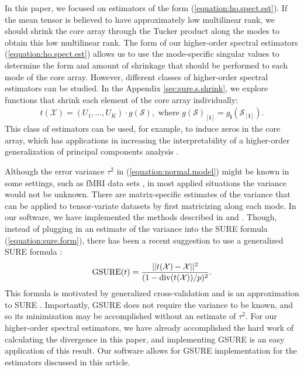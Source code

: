 In this paper, we focused on estimators of the form
(\ref{equation:ho.spect.est}). If the mean tensor is believed to have
approximately low multilinear rank, we should shrink the core array
through the Tucker product along the modes to obtain this low
multilinear rank. The form of our higher-order spectral estimators
(\ref{equation:ho.spect.est}) allows us to use the mode-specific
singular values to determine the form and amount of shrinkage that
should be performed to each mode of the core array. However, different
classes of higher-order spectral estimators can be studied. In the
Appendix \ref{sec:sure.s.shrink}, we explore functions that shrink
each element of the core array individually:
\begin{align*}
t(\mathcal{X}) = (U_1,\ldots,U_K)\cdot g(\mathcal{S}), \text{ where } g(\mathcal{S})_{[\mathbf{i}]} = g_{\mathbf{i}}(\mathcal{S}_{[\mathbf{i}]}).
\end{align*}
This class of estimators can be used, for example, to induce zeros in
the core array, which has applications in increasing the
interpretability of a higher-order generalization of principal
components analysis
\citep{henrion1993body,kiers1997uniqueness,murakami1998case,andersson1999general,de2001independent,martin2008jacobi}.

Although the error variance $\tau^2$ in (\ref{equation:normal.model})
might be known in some settings, such as fMRI data sets
\citep{candes2013unbiased}, in most applied situations the variance
would not be unknown. There are matrix-specific estimates of the
variance that can be applied to tensor-variate datasets by first
matricizing along each mode. In our software, we have implemented the
methods described in \citet{choi2014selecting} and
\citet{gavish2014optimalhard}. Though, instead of plugging in an
estimate of the variance into the SURE formula
(\ref{equation:sure.form}), there has been a recent suggestion to use
a generalized SURE formula
\citep{sylvain2012smooth,josse2015adaptive}:
\begin{align*}
\operatorname*{GSURE}(t) = \frac{||t(\mathcal{X}) - \mathcal{X}||^2}{(1 - \operatorname*{div}(t(\mathcal{X}))/p)^2}.
\end{align*}
This formula is motivated by generalized cross-validation
\citep{golub1979generalized} and is an approximation to SURE
\citep{josse2015adaptive}. Importantly, GSURE does not require the
variance to be known, and so its minimization may be accomplished
without an estimate of $\tau^2$. For our higher-order spectral
estimators, we have already accomplished the hard work of calculating
the divergence in this paper, and implementing GSURE is an easy
application of this result. Our software allows for GSURE
implementation for the estimators discussed in this article.


